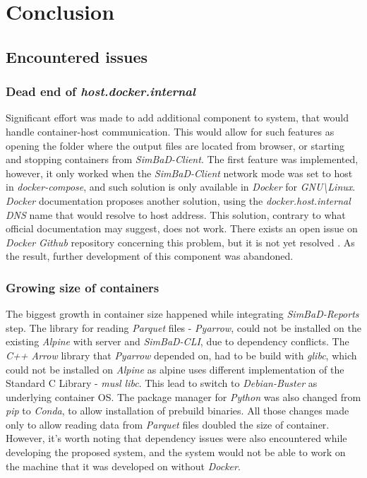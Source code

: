 \chapter{Conclusion}
\label{chapter:6}
\section{Encountered issues}
\subsection{Dead end of \textit{host.docker.internal}}
Significant effort was made to add additional component to system, that would handle container-host communication. This would allow for such features as opening the folder where the output files are located from browser, or starting and stopping containers from \textit{SimBaD-Client}. The first feature was implemented, however, it only worked when the \textit{SimBaD-Client} network mode was set to host in \textit{docker-compose}, and such solution is only available in \textit{Docker} for \textit{GNU\textbackslash Linux}. \textit{Docker} documentation proposes another solution, using the \textit{docker.host.internal} \textit{DNS} name that would resolve to host address. This solution, contrary to what official documentation may suggest, does not work. There exists an open issue on \textit{Docker} \textit{Github} repository concerning this problem, but it is not yet resolved \cite{DockerIssue}. As the result, further development of this component was abandoned.
\subsection{Growing size of containers}
The biggest growth in container size happened while integrating \textit{SimBaD-Reports} step. The library for reading \textit{Parquet} files - \textit{Pyarrow}, could not be installed on the existing \textit{Alpine} with server and \textit{SimBaD-CLI}, due to dependency conflicts. The \textit{C++ Arrow} library that \textit{Pyarrow} depended on, had to be build with \textit{glibc}, which could not be installed on \textit{Alpine} as alpine uses different implementation of the Standard C Library - \textit{musl libc}. This lead to switch to \textit{Debian-Buster} as underlying container OS. The package manager for \textit{Python} was also changed from \textit{pip} to \textit{Conda}, to allow installation of prebuild binaries.
All those changes made only to allow reading data from \textit{Parquet} files doubled the size of container. However, it's worth noting that dependency issues were also encountered while developing the proposed system, and the system would not be able to work on the machine that it was developed on without \textit{Docker}.
